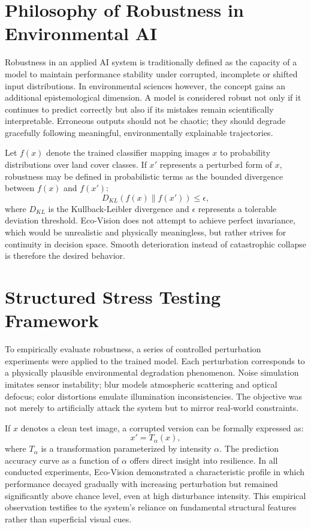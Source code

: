 \documentclass[12pt,a4paper]{report}
\begin{document}
\section{Philosophy of Robustness in Environmental AI}

Robustness in an applied AI system is traditionally defined as the capacity of a model to maintain performance stability under corrupted, incomplete or shifted input distributions. In environmental sciences however, the concept gains an additional epistemological dimension. A model is considered robust not only if it continues to predict correctly but also if its mistakes remain scientifically interpretable. Erroneous outputs should not be chaotic; they should degrade gracefully following meaningful, environmentally explainable trajectories.

Let \(f(x)\) denote the trained classifier mapping images \(x\) to probability distributions over land cover classes. If \(x'\) represents a perturbed form of \(x\), robustness may be defined in probabilistic terms as the bounded divergence between \(f(x)\) and \(f(x')\):
\[
D_{KL}(f(x) \parallel f(x')) \leq \epsilon,
\]
where \(D_{KL}\) is the Kullback-Leibler divergence and \(\epsilon\) represents a tolerable deviation threshold. Eco-Vision does not attempt to achieve perfect invariance, which would be unrealistic and physically meaningless, but rather strives for continuity in decision space. Smooth deterioration instead of catastrophic collapse is therefore the desired behavior.

\section{Structured Stress Testing Framework}

To empirically evaluate robustness, a series of controlled perturbation experiments were applied to the trained model. Each perturbation corresponds to a physically plausible environmental degradation phenomenon. Noise simulation imitates sensor instability; blur models atmospheric scattering and optical defocus; color distortions emulate illumination inconsistencies. The objective was not merely to artificially attack the system but to mirror real-world constraints.

If \(x\) denotes a clean test image, a corrupted version can be formally expressed as:
\[
x' = T_{\alpha}(x),
\]
where \(T_{\alpha}\) is a transformation parameterized by intensity \(\alpha\). The prediction accuracy curve as a function of \(\alpha\) offers direct insight into resilience. In all conducted experiments, Eco-Vision demonstrated a characteristic profile in which performance decayed gradually with increasing perturbation but remained significantly above chance level, even at high disturbance intensity. This empirical observation testifies to the system's reliance on fundamental structural features rather than superficial visual cues.
\end{document}
